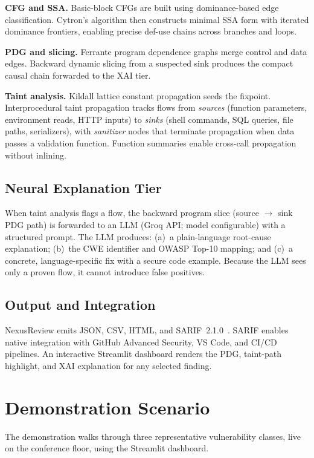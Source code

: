 \documentclass[10pt,conference]{IEEEtran}
\begin{document}
\textbf{CFG and SSA.}  Basic-block CFGs are built using dominance-based
edge classification. Cytron's algorithm then constructs minimal SSA
form with iterated dominance frontiers, enabling precise def-use chains
across branches and loops.

\textbf{PDG and slicing.} Ferrante program dependence graphs merge
control and data edges. Backward dynamic slicing from a suspected sink
produces the compact causal chain forwarded to the XAI tier.

\textbf{Taint analysis.} Kildall lattice constant propagation seeds the
fixpoint. Interprocedural taint propagation tracks flows from
\emph{sources} (function parameters, environment reads, HTTP inputs) to
\emph{sinks} (shell commands, SQL queries, file paths, serializers),
with \emph{sanitizer} nodes that terminate propagation when data passes
a validation function. Function summaries enable cross-call propagation
without inlining.

\subsection{Neural Explanation Tier}

When taint analysis flags a flow, the backward program slice (source
$\to$ sink PDG path) is forwarded to an LLM (Groq API; model
configurable) with a structured prompt. The LLM produces: (a)~a
plain-language root-cause explanation; (b)~the CWE identifier and OWASP
Top-10 mapping; and (c)~a concrete, language-specific fix with a secure
code example. Because the LLM sees only a proven flow, it cannot
introduce false positives.

\subsection{Output and Integration}

NexusReview emits JSON, CSV, HTML, and SARIF~2.1.0~\cite{sarif}.
SARIF enables native integration with GitHub Advanced Security, VS Code,
and CI/CD pipelines. An interactive Streamlit dashboard renders the PDG,
taint-path highlight, and XAI explanation for any selected finding.

\section{Demonstration Scenario}

The demonstration walks through three representative vulnerability
classes, live on the conference floor, using the Streamlit dashboard.
\end{document}
